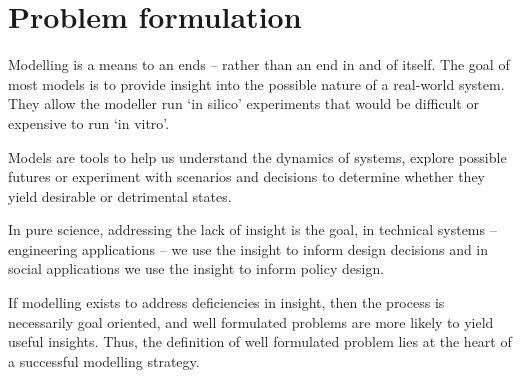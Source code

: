 \section{Problem formulation}

Modelling is a means to an ends -- rather than an end in and of itself. The goal
of most models is to provide insight into the possible nature of a real-world
system. They allow the modeller run `in silico' experiments that would be
difficult or expensive to run `in vitro'.

Models are tools to help us understand the dynamics of systems, explore possible
futures or experiment with scenarios and decisions to determine whether they
yield desirable or detrimental states.

In pure science, addressing the lack of insight is the goal, in technical
systems -- engineering applications -- we use the insight to inform design
decisions and in social applications we use the insight to inform policy
design.

If modelling exists to address deficiencies in insight, then the process is
necessarily goal oriented, and well formulated problems are more likely to yield
useful insights. Thus, the definition of well formulated problem lies at the heart
of a successful modelling strategy.


